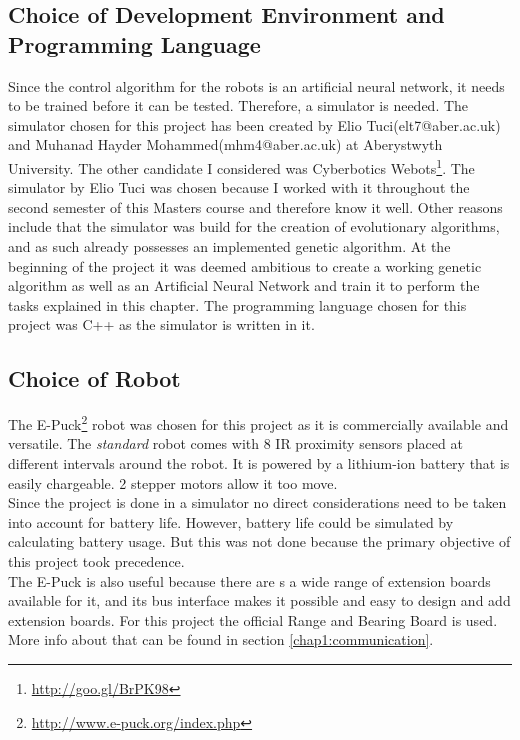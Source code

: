 \subsection{Choice of Development Environment and Programming Language}
Since the control algorithm for the robots is an artificial neural network, it needs to be trained before it can be tested. Therefore, a simulator is needed.
The simulator chosen for this project has been created by Elio Tuci(elt7@aber.ac.uk) and Muhanad Hayder Mohammed(mhm4@aber.ac.uk) at Aberystwyth University. 
The other candidate I considered was Cyberbotics Webots\footnote{\url{http://goo.gl/BrPK98}}. 
The simulator by Elio Tuci was chosen because I worked with it throughout the second semester of this Masters course and therefore know it well. Other reasons include that the simulator was build for the creation of evolutionary algorithms, and as such already possesses an implemented genetic algorithm. 
At the beginning of the project it was deemed ambitious to create a working genetic algorithm as well as an Artificial Neural Network and train it to perform the tasks explained in this chapter. 
The programming language chosen for this project was C++ as the simulator is written in it. 

\subsection{Choice of Robot}
The E-Puck\footnote{\url{http://www.e-puck.org/index.php}} robot was chosen for this project as it is commercially available and versatile. 
The \textit{standard} robot comes with 8 IR proximity sensors placed at different intervals around the robot. It is powered by a lithium-ion battery that is easily chargeable. 2 stepper motors allow it too move\cite{mondada2009puck}. \\

Since the project is done in a simulator no direct considerations need to be taken into account for battery life. However, battery life could be simulated by calculating battery usage. But this was not done because the primary objective of this project took precedence.\\

The E-Puck is also useful because there are s a wide range of extension boards available for it, and its bus interface makes it possible and easy to design and add extension boards. 
For this project the official Range and Bearing Board is used. More info about that can be found in section \ref{chap1:communication}\cite{Gutierrez}.

